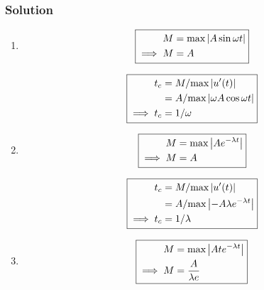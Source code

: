 \documentclass[12pt]{article}
\begin{document}
\subsubsection*{Solution}
\begin{enumerate}
\item
  \begin{equation*} \boxed{
    \begin{aligned}
      M &= \text{max}\left|{A\sin\omega t}\right| \\
      \implies M &= A \\
    \end{aligned}
    }
  \end{equation*}

  \begin{equation*} \boxed{
    \begin{aligned}
      t_c &= M/\text{max}\left|{u'(t)}\right| \\
      &= A/\text{max}\left|{\omega A \cos \omega t}\right| \\
      \implies t_c &= 1/\omega \\
    \end{aligned}
    }
  \end{equation*}
\item
  \begin{equation*} \boxed{
    \begin{aligned}
      M &= \text{max}\left|{Ae^{-\lambda t}}\right| \\
      \implies M &= A \\
    \end{aligned}
    }
  \end{equation*}

  \begin{equation*} \boxed{
    \begin{aligned}
      t_c &= M/\text{max}\left|{u'(t)}\right| \\
      &= A/\text{max}\left|{-A\lambda e^{-\lambda t}}\right| \\
      \implies t_c &= 1/\lambda \\
    \end{aligned}
    }
  \end{equation*}

\item
  \begin{equation*} \boxed{
      \begin{aligned}
        M &= \text{max}\left|{Ate^{-\lambda t}}\right| \\
        \implies M &= \frac{A}{\lambda e} \\
      \end{aligned}
    }
  \end{equation*}


\end{enumerate}
\end{document}
